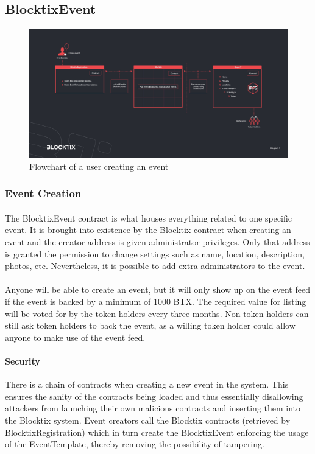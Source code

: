 \documentclass[a4paper]{article}
\begin{document}
\subsection{BlocktixEvent}

\begin{figure}
\centering
\includegraphics[scale=0.22]{BTX-Diagram-1.jpg}
\caption{\label{fig:BTX-Diagram-1}Flowchart of a user creating an event}
\end{figure}

\subsubsection{Event Creation}
\paragraph{}
The BlocktixEvent contract is what houses everything related to one specific event. It is brought into existence by the Blocktix contract when creating an event and the creator address is given administrator privileges. Only that address is granted the permission to change settings such as name, location, description, photos, etc. Nevertheless, it is possible to add extra administrators to the event.

\paragraph{}
Anyone will be able to create an event, but it will only show up on the event feed if the event is backed by a minimum of 1000 BTX. The required value for listing will be voted for by the token holders every three months. Non-token holders can still ask token holders to back the event, as a willing token holder could allow anyone to make use of the event feed.

\paragraph{Security} There is a chain of contracts when creating a new event in the system. This ensures the sanity of the contracts being loaded and thus essentially disallowing attackers from launching their own malicious contracts and inserting them into the Blocktix system. Event creators call the Blocktix contracts (retrieved by BlocktixRegistration) which in turn create the BlocktixEvent enforcing the usage of the EventTemplate, thereby removing the possibility of tampering.
\end{document}

